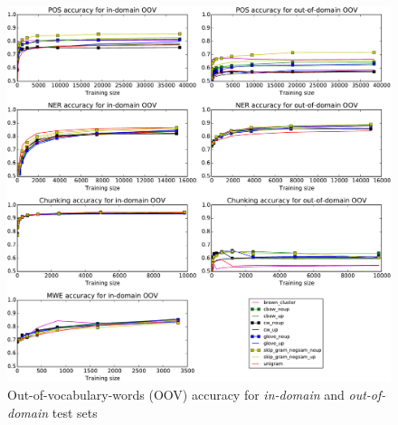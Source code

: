 \begin{figure}[t]
\centering
    	\includegraphics[scale=0.5]{plots/OOV-plots}
\caption{Out-of-vocabulary-words (OOV) accuracy for \textit{in-domain} and \textit{out-of-domain} test sets}
\label{OOV} 
\end{figure}







